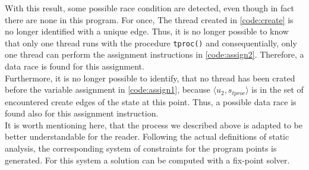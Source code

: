   With this result, some possible race condition are detected, even though in fact there are none in this program. For once, The thread created in \autoref{code:create} is no longer identified with a unique edge. Thus, it is no longer possible to know that only one thread runs with the procedure \texttt{tproc()} and consequentially, only one thread can perform the assignment instructions in \autoref{code:assign2}. Therefore, a data race is found for this assignment.\\
  Furthermore, it is no longer possible to identify, that no thread has been crated before the variable assignment in \autoref{code:assign1}, because $\langle u_2, s_{tproc} \rangle$ is in the set of encountered create edges of the state at this point. Thus, a possible data race is found also for this assignment instruction.\\
  It is worth mentioning here, that the process we described above is adapted to be better understandable for the reader. Following the actual definitions of static analysis, the corresponding system of constraints for the program points is generated. For this system a solution can be computed with a fix-point solver.\\

